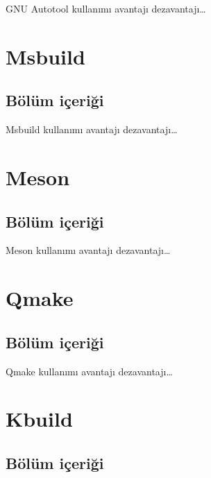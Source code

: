 \documentclass[
]{book}
\begin{document}
GNU Autotool kullanımı avantajı dezavantajı\ldots{}

\hypertarget{msbuild}{%
\chapter{Msbuild}\label{msbuild}}

\hypertarget{buxf6luxfcm-iuxe7eriux11fi-4}{%
\section{Bölüm içeriği}\label{buxf6luxfcm-iuxe7eriux11fi-4}}

Msbuild kullanımı avantajı dezavantajı\ldots{}

\hypertarget{meson}{%
\chapter{Meson}\label{meson}}

\hypertarget{buxf6luxfcm-iuxe7eriux11fi-5}{%
\section{Bölüm içeriği}\label{buxf6luxfcm-iuxe7eriux11fi-5}}

Meson kullanımı avantajı dezavantajı\ldots{}

\hypertarget{qmake}{%
\chapter{Qmake}\label{qmake}}

\hypertarget{buxf6luxfcm-iuxe7eriux11fi-6}{%
\section{Bölüm içeriği}\label{buxf6luxfcm-iuxe7eriux11fi-6}}

Qmake kullanımı avantajı dezavantajı\ldots{}

\hypertarget{kbuild}{%
\chapter{Kbuild}\label{kbuild}}

\hypertarget{buxf6luxfcm-iuxe7eriux11fi-7}{%
\section{Bölüm içeriği}\label{buxf6luxfcm-iuxe7eriux11fi-7}}
\end{document}
